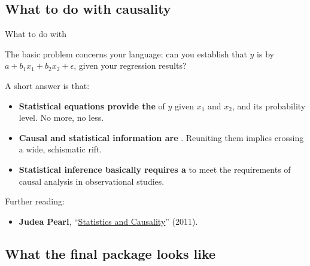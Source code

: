 \documentclass[t]{beamer}
\begin{document}
	\subsection{What to do with causality}
	
	\begin{frame}[t]{What to do with }
		
		The basic problem concerns your language: can you establish that $y$ is  by $a + b_1x_1 + b_2x_2 + \epsilon$, given your regression results?\vspace{1em}

		A short answer is that:
		
		\begin{itemize}

			\item \textbf{Statistical equations provide the } of $y$ given $x_1$ and $x_2$, and its probability level. No more, no less.
			
			\item \textbf{Causal and statistical information are }. Reuniting them implies crossing a wide, schismatic rift.
		
		 	\item \textbf{Statistical inference basically requires a } to meet the requirements of causal analysis in observational studies.
		\end{itemize}
		
		Further reading:
		
		\begin{itemize}
			\item \textbf{Judea Pearl}, ``\href{http://ftp.cs.ucla.edu/pub/stat_ser/r373-reprint.pdf}{Statistics and Causality}'' (2011).
		\end{itemize}
	\end{frame}

	\subsection{What the final package looks like}
	
\end{document}
